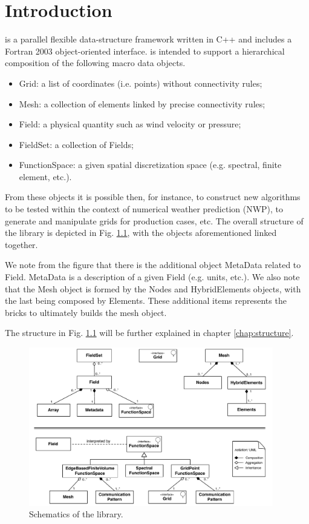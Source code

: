 \chapter{Introduction}
\Atlas is a parallel flexible data-structure framework written in C++ 
and includes a Fortran 2003 object-oriented interface. \Atlas is intended 
to support a hierarchical composition of the following macro data objects.
%
\begin{itemize}
\item Grid: a list of coordinates (i.e. points) without connectivity 
rules;
\item Mesh: a collection of elements linked by precise connectivity 
rules;
\item Field: a physical quantity such as wind velocity or pressure;
\item FieldSet: a collection of Fields;
\item FunctionSpace: a given spatial discretization space (e.g. spectral, 
finite element, etc.).
\end{itemize}
%
From these objects it is possible then, for instance, to construct 
new algorithms to be tested within the context of numerical weather 
prediction (NWP), to generate and manipulate grids for production 
cases, etc. The overall structure of the library is depicted in 
Fig. \ref{fig:intro-schematics}, with the objects aforementioned 
linked together. 

We note from the figure that there is the additional object MetaData 
related to Field. MetaData is a description of a given Field (e.g. 
units, etc.).
We also note that the Mesh object is formed by the Nodes and HybridElements
objects, with the last being composed by Elements. These additional 
items represents the bricks to ultimately builds the mesh object.
 
The structure in Fig. \ref{fig:intro-schematics} will be further 
explained in chapter \ref{chap:structure}.
%
\begin{figure}[H]
  \centering
    \includegraphics[width=0.95\textwidth]{imgs/schematics}
    \caption{Schematics of the \Atlas library.}
    \label{fig:intro-schematics}
\end{figure}
%